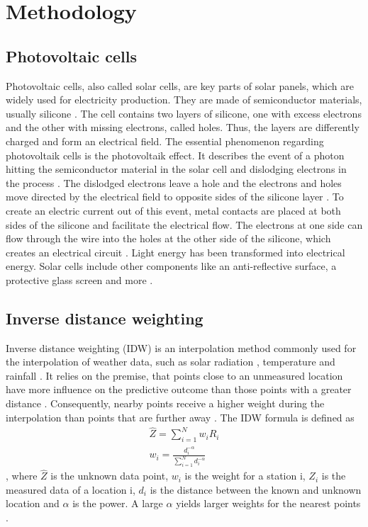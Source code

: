 \documentclass{article}
\begin{document}
\section{Methodology}
\subsection{Photovoltaic cells}\label{sec:pv}

Photovoltaic cells, also called solar cells, are key parts of solar panels, which are widely used for electricity production.
They are made of semiconductor materials, usually silicone \cite{Goetzberger2002}. The cell contains two layers of silicone, one with excess electrons and the other with missing electrons, called holes. Thus, the layers are differently charged and form an electrical field. 
The essential phenomenon regarding photovoltaik cells is the photovoltaik effect. It describes the event of a photon hitting the semiconductor material in the solar cell and dislodging electrons in the process \cite{Ndiaye2013}. The dislodged electrons leave a hole and the electrons and holes move directed by the electrical field to opposite sides of the silicone layer \cite{SolarCells}. To create an electric current out of this event, metal contacts are placed at both sides of the silicone and facilitate the electrical flow. The electrons at one side can flow through the wire into the holes at the other side of the silicone, which creates an electrical circuit \cite{SolarCells}. Light energy has been transformed into electrical energy. Solar cells include other components like an anti-reflective surface, a protective glass screen and more \cite{SolarCells}.

\subsection{Inverse distance weighting}
Inverse distance weighting (IDW) is an interpolation method commonly used for the interpolation of weather data, such as solar radiation \cite{Loghmari2018}, temperature \cite{Cao2009} and rainfall \cite{Chen2012}. 
It relies on the premise, that points close to an unmeasured location have more influence on the predictive outcome than those points with a greater distance \cite{Chen2012}. 
Consequently, nearby points receive a higher weight during the interpolation than points that are further away \cite{Lu2008}. 
The IDW formula is defined as
\begin{align}
    \hat{Z} = \sum_{i=1}^N w_iR_i \\
    w_i = \frac{d_i^{-\alpha}}{\sum_{i=1}^N{d_i^{-\alpha}}}
\end{align} \cite{Chen2012},
 where $\hat{Z}$ is the unknown data point, $w_i$ is the weight for a station i, $Z_i$ is the measured data of a location i, $d_i$ is the distance between the known and unknown location and $\alpha$ is the power. 
 A large $\alpha$ yields larger weights for the nearest points \cite{Lu2008}.
\end{document}
